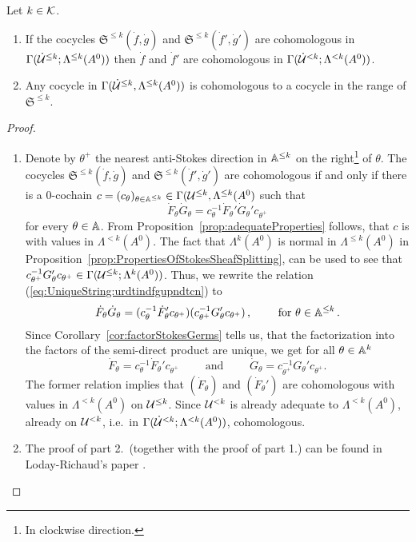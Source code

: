 \begin{lem}
  Let $k\in\mathcal{K}$.
  \begin{enumerate}
    \item If the cocycles $\mathfrak{S}^{\leq k}(\dot f,\dot g)$ and
      $\mathfrak{S}^{\leq k}(\dot f',\dot g')$ are cohomologous in
      $\Gamma(\dot{\mathcal{U}}^{\leq k};\Lambda^{\leq k}(A^0))$
      then $\dot f$ and $\dot f'$ are cohomologous in
      $\Gamma(\dot{\mathcal{U}}^{<k};\Lambda^{<k}(A^0))$.
    \item Any cocycle in $\Gamma(\dot{\mathcal{U}}^{\leq k},\Lambda^{\leq k}(A^0))$ is
      cohomologous to a cocycle in the range of $\mathfrak{S}^{\leq k}$.
  \end{enumerate}
\end{lem}
\begin{proof}
  \begin{enumerate}
    \item Denote by $\theta^+$ the nearest anti-Stokes direction in
      $\mathbb{A}^{\leq k}$ on the right\footnote{In clockwise direction.} of $\theta$.
      The cocycles $\mathfrak{S}^{\leq k}(\dot f,\dot g)$ and
      $\mathfrak{S}^{\leq k}(\dot f',\dot g')$ are cohomologous if and only
      if there is a $0$-cochain $c=(c_\theta)_{\theta\in\mathbb{A}^{\leq k}}
      \in\Gamma(\mathcal{U}^{\leq k},\Lambda^{\leq k}(A^0)$ such that
      \begin{equation}\label{eq:UniqueString:urdtindfgupndtcn}
        \dot F_\theta\dot G_\theta =
        c_\theta^{-1}\dot F_\theta'\dot G_\theta'c_{\theta^+}
      \end{equation}
      for every $\theta\in\mathbb{A}$. From Proposition~\ref{prop:adequateProperties}
      follows, that $c$ is with values in $\Lambda^{<k}(A^0)$.
      The fact that $\Lambda^k(A^0)$ is normal in $\Lambda^{\leq k}(A^0)$ in
      Proposition~\ref{prop:PropertiesOfStokesSheafSplitting}, can be used to
      see that $ c_{\theta^+}^{-1}G_\theta'c_{\theta^+}
      \in\Gamma(\mathcal{U}^{\leq k};\Lambda^{k}(A^0))$.
      Thus, we rewrite the relation (\ref{eq:UniqueString:urdtindfgupndtcn}) to
      \[
        \dot F_\theta\dot G_\theta =
        (c_\theta^{-1}\dot F_\theta'c_{\theta^+})
        (c_{\theta^+}^{-1}G_\theta'c_{\theta^+})
        \,,\qquad\text{~for~} \theta\in\mathbb{A}^{\leq k} \,.
      \]
      Since Corollary~\ref{cor:factorStokesGerms} tells us, that the
      factorization into the factors of the semi-direct product are unique, we
      get for all $\theta\in\mathbb{A}^k$
      \[
        \dot F_\theta=c_\theta^{-1}\dot F_\theta'c_{\theta^+}
        \qquad \text{~and~} \qquad
        \dot G_\theta=c_{\theta^+}^{-1}G_\theta'c_{\theta^+}.
      \]
      The former relation implies that $(\dot F_\theta)$ and $(\dot F_\theta')$
      are cohomologous with values in $\Lambda^{<k}(A^0)$ on $\mathcal{U}^{\leq k}$.
      Since $\mathcal{U}^{<k}$ is already adequate to $\Lambda^{<k}(A^0)$,  already on $\mathcal{U}^{<k}$,
      i.e.\ in $\Gamma(\dot{\mathcal{U}}^{<k};\Lambda^{<k}(A^0))$, cohomologous.
    \item The proof of part 2.\ (together with the proof of part 1.) can be
      found in Loday-Richaud's paper \cite[Proof of Lem.II.3.3]{Loday1994}.
      \TODO[PROOF!]
  \end{enumerate}
\end{proof}
